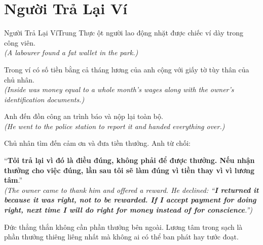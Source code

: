 \section{Người Trả Lại Ví}
\begin{truyen}{Người Trả Lại Ví}{Trung Thực}
ột người lao động nhặt được chiếc ví dày trong công viên.\\
\textit{(A labourer found a fat wallet in the park.)}

Trong ví có số tiền bằng cả tháng lương của anh cộng với giấy tờ tùy thân của chủ nhân.\\
\textit{(Inside was money equal to a whole month's wages along with the owner's identification documents.)}

Anh đến đồn công an trình báo và nộp lại toàn bộ.\\
\textit{(He went to the police station to report it and handed everything over.)}

Chủ nhân tìm đến cảm ơn và đưa tiền thưởng. Anh từ chối:

``\textbf{Tôi trả lại vì đó là điều đúng, không phải để được thưởng. Nếu nhận thưởng cho việc đúng, lần sau tôi sẽ làm đúng vì tiền thay vì vì lương tâm}.''\\
\textit{(The owner came to thank him and offered a reward. He declined: ``\textbf{I returned it because it was right, not to be rewarded. If I accept payment for doing right, next time I will do right for money instead of for conscience}.'')}
\end{truyen}
\begin{baihoc}
  Đức thẳng thắn không cần phần thưởng bên ngoài. Lương tâm trong sạch là phần thưởng thiêng liêng nhất mà không ai có thể ban phát hay tước đoạt.
\end{baihoc}

